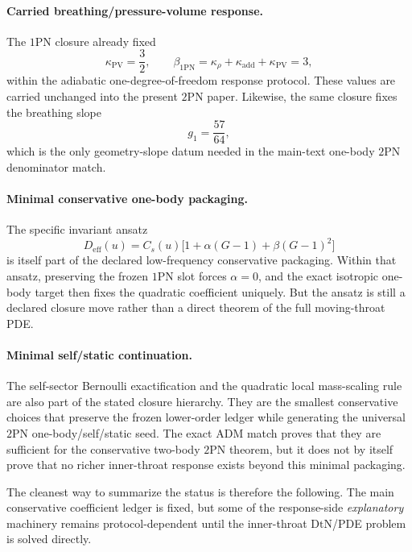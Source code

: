 \documentclass[11pt]{article}
\newcommand{\OnePN}{\mathrm{1PN}}
\newcommand{\TwoPN}{\mathrm{2PN}}
\newcommand{\ADM}{\mathrm{ADM}}
\newcommand{\DtN}{\mathrm{DtN}}
\newcommand{\eff}{\mathrm{eff}}
\newcommand{\kadd}{\kappa_{\mathrm{add}}}
\newcommand{\kPV}{\kappa_{\mathrm{PV}}}
\newcommand{\krho}{\kappa_{\rho}}
\begin{document}
\paragraph{Carried breathing/pressure-volume response.}
The \(\OnePN\) closure already fixed
\begin{equation}
\kPV=\frac32,
\qquad
\beta_{\OnePN}=\krho+\kadd+\kPV=3,
\label{eq:status-protocol-kpv-beta}
\end{equation}
within the adiabatic one-degree-of-freedom response protocol.
These values are carried unchanged into the present \(\TwoPN\) paper.
Likewise, the same closure fixes the breathing slope
\begin{equation}
g_1=\frac{57}{64},
\label{eq:status-protocol-g1}
\end{equation}
which is the only geometry-slope datum needed in the main-text one-body
\(\TwoPN\) denominator match.

\paragraph{Minimal conservative one-body packaging.}
The specific invariant ansatz
\begin{equation}
D_{\eff}(u)=C_s(u)\bigl[1+\alpha(G-1)+\beta(G-1)^2\bigr]
\label{eq:status-protocol-deff-ansatz}
\end{equation}
is itself part of the declared low-frequency conservative packaging.
Within that ansatz, preserving the frozen \(\OnePN\) slot forces \(\alpha=0\), and the
exact isotropic one-body target then fixes the quadratic coefficient uniquely.
But the ansatz is still a declared closure move rather than a direct theorem of the full
moving-throat PDE.

\paragraph{Minimal self/static continuation.}
The self-sector Bernoulli exactification and the quadratic local mass-scaling rule are
also part of the stated closure hierarchy.
They are the smallest conservative choices that preserve the frozen lower-order ledger
while generating the universal \(\TwoPN\) one-body/self/static seed.
The exact \(\ADM\) match proves that they are sufficient for the conservative two-body
\(\TwoPN\) theorem, but it does not by itself prove that no richer inner-throat response
exists beyond this minimal packaging.

The cleanest way to summarize the status is therefore the following.
The main conservative coefficient ledger is fixed, but some of the response-side
\emph{explanatory} machinery remains protocol-dependent until the inner-throat
\(\DtN\)/PDE problem is solved directly.
\end{document}
